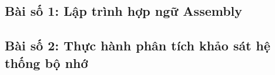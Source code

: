 \subsection{Bài số 1: Lập trình hợp ngữ Assembly}


\subsection{Bài số 2: Thực hành phân tích khảo sát hệ thống bộ nhớ}
